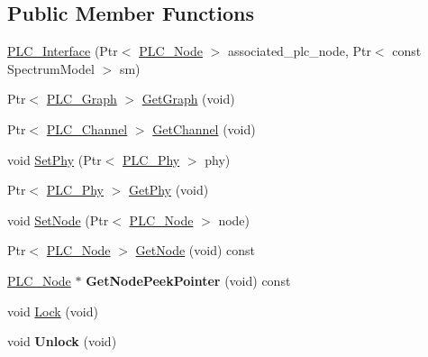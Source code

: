 \subsection*{\-Public \-Member \-Functions}
\begin{DoxyCompactItemize}
\item 
\hyperlink{classns3_1_1PLC__Interface_a927245efbd7f1d63e14e9a899903c163}{\-P\-L\-C\-\_\-\-Interface} (\-Ptr$<$ \hyperlink{classns3_1_1PLC__Node}{\-P\-L\-C\-\_\-\-Node} $>$ associated\-\_\-plc\-\_\-node, \-Ptr$<$ const \-Spectrum\-Model $>$ sm)
\item 
\-Ptr$<$ \hyperlink{classns3_1_1PLC__Graph}{\-P\-L\-C\-\_\-\-Graph} $>$ \hyperlink{classns3_1_1PLC__Interface_a8a4c6651e7bd4883ef2dd5c7e7f71fbf}{\-Get\-Graph} (void)
\item 
\-Ptr$<$ \hyperlink{classns3_1_1PLC__Channel}{\-P\-L\-C\-\_\-\-Channel} $>$ \hyperlink{classns3_1_1PLC__Interface_a86335fbf5d53c00ad1af68fb21160857}{\-Get\-Channel} (void)
\item 
void \hyperlink{classns3_1_1PLC__Interface_ae5f7967e8e11add42d9062b6bff000e5}{\-Set\-Phy} (\-Ptr$<$ \hyperlink{classns3_1_1PLC__Phy}{\-P\-L\-C\-\_\-\-Phy} $>$ phy)
\item 
\-Ptr$<$ \hyperlink{classns3_1_1PLC__Phy}{\-P\-L\-C\-\_\-\-Phy} $>$ \hyperlink{classns3_1_1PLC__Interface_ab1eaf63c2a5aef32069279c6cf3d272a}{\-Get\-Phy} (void)
\item 
void \hyperlink{classns3_1_1PLC__Interface_a0e8ee852d599842463e7d729fbdd9780}{\-Set\-Node} (\-Ptr$<$ \hyperlink{classns3_1_1PLC__Node}{\-P\-L\-C\-\_\-\-Node} $>$ node)
\item 
\-Ptr$<$ \hyperlink{classns3_1_1PLC__Node}{\-P\-L\-C\-\_\-\-Node} $>$ \hyperlink{classns3_1_1PLC__Interface_a0cdbe245c4a72b78d0c7ef5346bc621f}{\-Get\-Node} (void) const 
\item 
\hypertarget{classns3_1_1PLC__Interface_a0f383f5a874a805ef2faec17c609cd60}{\hyperlink{classns3_1_1PLC__Node}{\-P\-L\-C\-\_\-\-Node} $\ast$ {\bfseries \-Get\-Node\-Peek\-Pointer} (void) const }\label{classns3_1_1PLC__Interface_a0f383f5a874a805ef2faec17c609cd60}

\item 
void \hyperlink{classns3_1_1PLC__Interface_aaa45cf03953a3989bf3dae3a423b5c99}{\-Lock} (void)
\item 
\hypertarget{classns3_1_1PLC__Interface_acb8badf569663b34aaa272372836549e}{void {\bfseries \-Unlock} (void)}\label{classns3_1_1PLC__Interface_acb8badf569663b34aaa272372836549e}

\end{DoxyCompactItemize}
